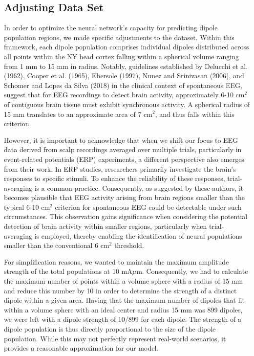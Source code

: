 \documentclass[a4paper, UKenglish, 11pt]{uiomaster}
\begin{document}
\subsection{Adjusting Data Set}

In order to optimize the neural network's capacity for predicting dipole population regions, we made specific adjustments to the dataset. Within this framework, each dipole population comprises individual dipoles distributed across all points within the NY head cortex falling within a spherical volume ranging from 1 mm to 15 mm in radius. Notably, guidelines established by Delucchi et al. (1962), Cooper et al. (1965), Ebersole (1997), Nunez and Srinivasan (2006), and Schomer and Lopes da Silva (2018) in the clinical context of spontaneous EEG, suggest that for EEG recordings to detect brain activity, approximately 6-10 cm$^2$ of contiguous brain tissue must exhibit synchronous activity. A spherical radius of 15 mm translates to an approximate area of 7 cm$^2$, and thus falls within this criterion.

However, it is important to acknowledge that when we shift our focus to EEG data derived from scalp recordings averaged over multiple trials,  particularly in event-related potentials (ERP) experiments, a different perspective also emerges from their work. In ERP studies, researchers primarily investigate the brain's responses to specific stimuli. To enhance the reliability of these responses, trial-averaging is a common practice. Consequently, as suggested by these authors, it becomes plausible that EEG activity arising from brain regions smaller than the typical 6-10 cm$^2$ criterion for spontaneous EEG could be detectable under such circumstances. This observation gains significance when considering the potential detection of brain activity within smaller regions, particularly when trial-averaging is employed, thereby enabling the identification of neural populations smaller than the conventional 6 cm$^2$ threshold.


For simplification reasons, we wanted to maintain the maximum amplitude strength of the total populations at 10 mA$\mu$m. Consequently, we had to calculate the maximum number of points within a volume sphere with a radius of 15 mm and reduce this number by 10 in order to determine the strength of a distinct dipole within a given area. Having that the maximum number of dipoles that fit within a volume sphere with an ideal center and radius 15 mm was 899 dipoles, we were left with a dipole strength of 10/899 for each dipole. The strength of a dipole population is thus directly proportional to the size of the dipole population. While this may not perfectly represent real-world scenarios, it provides a reasonable approximation for our model.
\end{document}
